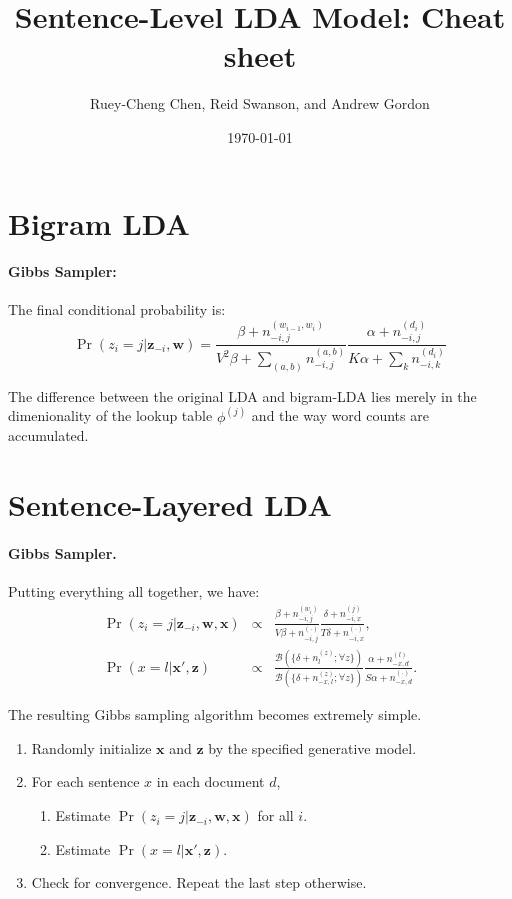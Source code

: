 \documentclass{article}
\begin{document}
\author{Ruey-Cheng Chen, Reid Swanson, and Andrew Gordon}
\title{Sentence-Level LDA Model: Cheat sheet}
\date{\today}
\maketitle

\section{Bigram LDA}

\paragraph{Gibbs Sampler:}  The final conditional probability is:
\begin{equation}
    \Pr(z_i = j|\mathbf{z}_{-i}, \mathbf{w}) =
    \frac{\beta + n^{(w_{i-1},w_i)}_{-i,j}}{V^2 \beta + \sum_{(a,b)} n^{(a,b)}_{-i,j}} 
    \frac{\alpha + n^{(d_i)}_{-i,j}}{K \alpha + \sum_k n^{(d_i)}_{-i,k}}
\end{equation}

The difference between the original LDA and bigram-LDA lies merely in the dimenionality of the
lookup table $\phi^{(j)}$ and the way word counts are accumulated.

\section{Sentence-Layered LDA}

\paragraph{Gibbs Sampler.}  Putting everything all together, we have:
\begin{eqnarray}
  \Pr(z_i = j|\mathbf{z}_{-i}, \mathbf{w}, \mathbf{x}) &\propto&
    \frac{\beta + n_{-i,j}^{(w_i)}}{V \beta + n_{-i,j}^{(\cdot)}} 
    \frac{\delta + n_{-i,x}^{(j)}}{T \delta + n_{-i,x}^{(\cdot)}}, \\
  \Pr(x = l|\mathbf{x}',\mathbf{z}) &\propto&
    \frac{\mathcal{B}(\{\delta + n_l^{(z)}; \forall z\})}{\mathcal{B}(\{\delta + n_{-x,l}^{(z)}; \forall z\})}
    \frac{\alpha + n_{-x,d}^{(l)}}{S \alpha + n_{-x,d}^{(\cdot)}}.
\end{eqnarray}

The resulting Gibbs sampling algorithm becomes extremely simple.

\begin{enumerate}
  \item Randomly initialize $\mathbf{x}$ and $\mathbf{z}$ by the specified generative model.
  \item For each sentence $x$ in each document $d$, \begin{enumerate}
    \item Estimate $\Pr(z_i = j|\mathbf{z}_{-i}, \mathbf{w}, \mathbf{x})$ for all $i$.
    \item Estimate $\Pr(x = l|\mathbf{x}',\mathbf{z})$.
  \end{enumerate}
  \item Check for convergence.  Repeat the last step otherwise.
\end{enumerate}
\end{document}
